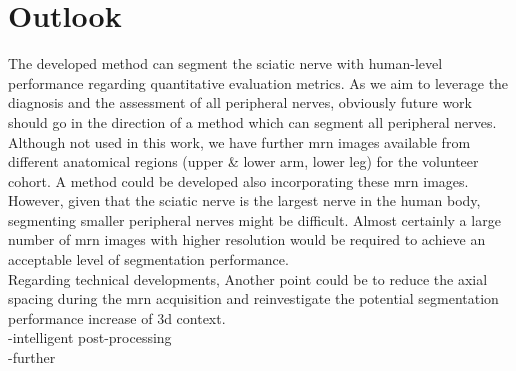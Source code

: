 \chapter{Outlook} \label{chap:outlook}
The developed method can segment the sciatic nerve with human-level performance regarding quantitative evaluation metrics. As we aim to leverage the diagnosis and the assessment of all peripheral nerves, obviously future work should go in the direction of a method which can segment all peripheral nerves. Although not used in this work, we have further \gls{mrn} images available from different anatomical regions (upper \& lower arm, lower leg) for the volunteer cohort. A method could be developed also incorporating these \gls{mrn} images. However, given that the sciatic nerve is the largest nerve in the human body, segmenting smaller peripheral nerves might be difficult. Almost certainly a large number of \gls{mrn} images with higher resolution would be required to achieve an acceptable level of segmentation performance.\\
Regarding technical developments, Another point could be to reduce the axial spacing during the \gls{mrn} acquisition and reinvestigate the potential segmentation performance increase of \gls{3d} context.\\

-intelligent post-processing\\
-further

\endinput